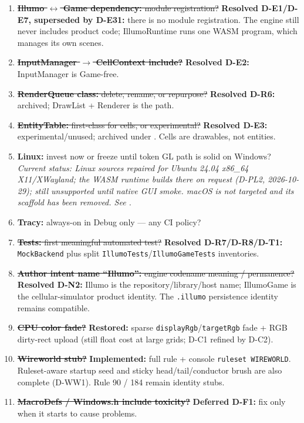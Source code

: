\begin{openbox}
\begin{enumerate}
  \item \sout{\textbf{Illumo $\leftrightarrow$ Game dependency:} module registration?}
        \textbf{Resolved D-E1/D-E7, superseded by D-E31:} there is no module
        registration. The engine still never includes product code;
        IllumoRuntime runs one WASM program, which manages its own scenes.
  \item \sout{\textbf{InputManager $\rightarrow$ CellContext include?}}
        \textbf{Resolved D-E2:} InputManager is Game-free.
  \item \sout{\textbf{RenderQueue class:} delete, rename, or repurpose?}
        \textbf{Resolved D-R6:} archived; DrawList + Renderer is the path.
  \item \sout{\textbf{EntityTable:} first-class for cells, or experimental?}
        \textbf{Resolved D-E3:} experimental/unused; archived under
        . Cells are drawables, not entities.

  \item \textbf{Linux:} invest now or freeze until token GL path is solid
        on Windows?
        \emph{Current status: Linux sources repaired for Ubuntu 24.04 x86\_64
        X11/XWayland; the WASM runtime builds there on request (D-PL2,
        2026-10-29); still unsupported until native GUI smoke. macOS is not
        targeted and its scaffold has been removed. See .}
  \item \textbf{Tracy:} always-on in Debug only --- any CI policy?
  \item \sout{\textbf{Tests:} first meaningful automated test?}
        \textbf{Resolved D-R7/D-R8/D-T1:} \texttt{MockBackend} plus split
        \texttt{IllumoTests}/\texttt{IllumoGameTests} inventories.
  \item \sout{\textbf{Author intent name ``Illumo'':} engine codename meaning /
        permanence?}
        \textbf{Resolved D-N2:} Illumo is the repository/library/host name;
        IllumoGame is the cellular-simulator product identity. The
        \texttt{.illumo} persistence identity remains compatible.
  \item \sout{\textbf{CPU color fade?}}
        \textbf{Restored:} sparse \texttt{displayRgb}/\texttt{targetRgb} fade +
        RGB dirty-rect upload (still float cost at large grids; D-C1 refined by D-C2).
  \item \sout{\textbf{Wireworld stub?}}
        \textbf{Implemented:} full rule + console \texttt{ruleset WIREWORLD}.
        Ruleset-aware startup seed and sticky head/tail/conductor brush are
        also complete (D-WW1). Rule 90 / 184 remain identity stubs.
  \item \sout{\textbf{MacroDefs / Windows.h include toxicity?}}
        \textbf{Deferred D-F1:} fix only when it starts to cause problems.
\end{enumerate}
\end{openbox}

